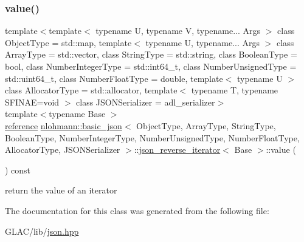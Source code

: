 \subsubsection{\texorpdfstring{value()}{value()}}
{\footnotesize\ttfamily template$<$template$<$ typename U, typename V, typename... Args $>$ class Object\+Type = std\+::map, template$<$ typename U, typename... Args $>$ class Array\+Type = std\+::vector, class String\+Type  = std\+::string, class Boolean\+Type  = bool, class Number\+Integer\+Type  = std\+::int64\+\_\+t, class Number\+Unsigned\+Type  = std\+::uint64\+\_\+t, class Number\+Float\+Type  = double, template$<$ typename U $>$ class Allocator\+Type = std\+::allocator, template$<$ typename T, typename S\+F\+I\+N\+A\+E=void $>$ class J\+S\+O\+N\+Serializer = adl\+\_\+serializer$>$ \\
template$<$typename Base $>$ \\
\mbox{\hyperlink{classnlohmann_1_1basic__json_1_1json__reverse__iterator_ab0021ef2007fd338615360af404dcd4e}{reference}} \mbox{\hyperlink{classnlohmann_1_1basic__json}{nlohmann\+::basic\+\_\+json}}$<$ Object\+Type, Array\+Type, String\+Type, Boolean\+Type, Number\+Integer\+Type, Number\+Unsigned\+Type, Number\+Float\+Type, Allocator\+Type, J\+S\+O\+N\+Serializer $>$\+::\mbox{\hyperlink{classnlohmann_1_1basic__json_1_1json__reverse__iterator}{json\+\_\+reverse\+\_\+iterator}}$<$ Base $>$\+::value (\begin{DoxyParamCaption}{ }\end{DoxyParamCaption}) const\hspace{0.3cm}{\ttfamily [inline]}}



return the value of an iterator 



The documentation for this class was generated from the following file\+:\begin{DoxyCompactItemize}
\item 
G\+L\+A\+C/lib/\mbox{\hyperlink{json_8hpp}{json.\+hpp}}\end{DoxyCompactItemize}
